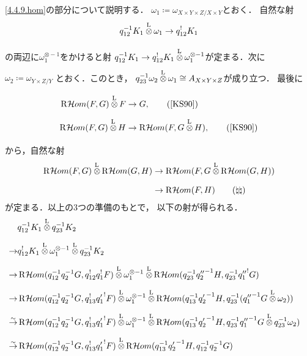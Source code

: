 \documentclass[leqno, 10pt, a4paper, dvipdfmx]{jsarticle}
\makeatletter
\theoremstyle{definition}
\renewenvironment{proof}[1][\proofname]{\par
  \pushQED{\qed}%
  \normalfont \topsep6\p@\@plus6\p@\relax
  \trivlist
  \item[\hskip\labelsep
         \bfseries
    {#1}]\ignorespaces
}{%
  \popQED\endtrivlist\@endpefalse
}
\renewcommand{\proofname}{証明.}
\numberwithin{equation}{section}
\newcommand{\HOM}{\mathop{\mathcal{H}\hspace{-0pt}om}\nolimits}%
\newcommand{\RHOM}{\mathop{\mathrm{R}\hspace{-1.5pt}\HOM}\nolimits}
\newcommand{\simar}{\mathrel{\overset{\sim}{\rightarrow}}}%
\newcommand{\tens}[1][]{\mathbin{\otimes_{\raise1.5ex\hbox to-.1em{}{#1}}}}
\newcommand{\lltens}[1][]{\mathbin{{\mathop{\tens}\limits^{\mathrm{L}}_{#1}}}}
\theoremstyle{mystyle}
\makeatother
\begin{document}
\begin{proof}
  \eqref{4.4.9.hom}の部分について説明する．
  \(
    \omega_{1}
    \coloneqq
    \omega_{X\times Y\times Z/X\times Y}
  \)とおく．
  自然な射\[
    q_{12}^{-1}K_1
    \lltens[]
    \omega_{1}
    \to q_{12}^{!}K_1
  \]の両辺に\(
    \omega_{1}^{\otimes-1}
  \)をかけると射
  \(
    q_{12}^{-1}K_1
    \to q_{12}^{!}K_1
    \lltens[]
    \omega_{1}^{\otimes-1}
  \)が定まる．次に
  \(\omega_{2}\coloneqq \omega_{Y\times Z/Y}\)
  とおく．このとき，
  \(
    q_{23}^{-1}\omega_2\lltens[]\omega_1
    \cong 
    A_{X\times Y\times Z}
  \)が成り立つ．
  最後に
  \begin{align*}
    \RHOM(F,G)\lltens[]F&\to G, 
    \tag{{\cite[(2.2.10)]{KS90}}}\\
    \RHOM(F,G)\lltens[]H&\to \RHOM(F,G\lltens[]H), 
    \tag{{\cite[(2.2.11)]{KS90}}}
  \end{align*}
  から，自然な射
  \begin{align*}
      \RHOM(F,G)\lltens[]\RHOM(G,H)
      &\to \RHOM(F,G\lltens[]\RHOM(G,H)) \\
      &\to \RHOM(F,H)
    \tag{\(\natural\natural\)}\label{4.4.9.contraction}
  \end{align*}
  が定まる．以上の3つの準備のもとで，
  以下の射が得られる．
  \begin{align*}
    &q_{12}^{-1}K_1
      \lltens[]
      q_{23}^{-1}K_2
    &&\text{}\\
    \to&
      q_{12}^{!}K_1
      \lltens[]\omega_{1}^{\otimes-1}
      \lltens[]
      q_{23}^{-1}K_2
    &&\text{}\\
    \to&
      \RHOM(q_{12}^{-1}q_{2}^{-1}G,q_{12}^{!}q_{1}^{!}F)
      \lltens[]\omega_{1}^{\otimes-1}
      \lltens[]
      \RHOM(q_{23}^{-1}{q_{2}''}^{-1}H,q_{23}^{-1}{q_{1}''}^{!}G)
    &&%
    \\
    \to&
      \RHOM(q_{12}^{-1}q_{2}^{-1}G,q_{13}^{!}{q'_{1}}^{!}F)
      \lltens[]\omega_{1}^{\otimes-1}
      \lltens[]
      \RHOM(q_{13}^{-1}{q_{2}'}^{-1}H,q_{23}^{-1}({q_{1}''}^{-1}G\lltens[]\omega_{2}))
    &&\text{}\\
    \simar&
      \RHOM(q_{12}^{-1}q_{2}^{-1}G,q_{13}^{!}{q'_{1}}^{!}F)
      \lltens[]
      \omega_{1}^{\otimes-1}
      \lltens[]
      \RHOM(q_{13}^{-1}{q_{2}'}^{-1}H,q_{23}^{-1}{q_{1}''}^{-1}G\lltens[]q_{23}^{-1}\omega_{2})
    &&\text{}\\
    \simar&
      \RHOM(q_{12}^{-1}q_{2}^{-1}G,q_{13}^{!}{q'_{1}}^{!}F)
      \lltens[]
      \RHOM(
        q_{13}^{-1}{q_{2}'}^{-1}H,
        q_{12}^{-1}q_{2}^{-1}G
      )

\end{align*}
\end{proof}
\end{document}
